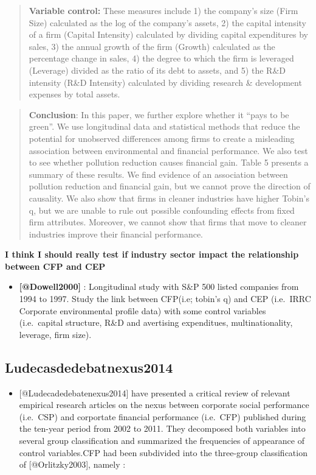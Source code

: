 \documentclass[]{article}
\providecommand{\tightlist}{%
  \setlength{\itemsep}{0pt}\setlength{\parskip}{0pt}}
\begin{document}
\begin{quote}
\textbf{Variable control:} These measures include 1) the company's size
(Firm Size) calculated as the log of the company's assets, 2) the
capital intensity of a firm (Capital Intensity) calculated by dividing
capital expenditures by sales, 3) the annual growth of the firm (Growth)
calculated as the percentage change in sales, 4) the degree to which the
firm is leveraged (Leverage) divided as the ratio of its debt to assets,
and 5) the R\&D intensity (R\&D Intensity) calculated by dividing
research \& development expenses by total assets.
\end{quote}

\begin{quote}
\textbf{Conclusion}: In this paper, we further explore whether it ``pays
to be green''. We use longitudinal data and statistical methods that
reduce the potential for unobserved differences among firms to create a
misleading association between environmental and financial performance.
We also test to see whether pollution reduction causes financial gain.
Table 5 presents a summary of these results. We find evidence of an
association between pollution reduction and financial gain, but we
cannot prove the direction of causality. We also show that firms in
cleaner industries have higher Tobin's q, but we are unable to rule out
possible confounding effects from fixed firm attributes. Moreover, we
cannot show that firms that move to cleaner industries improve their
financial performance.
\end{quote}

\textbf{I think I should really test if industry sector impact the
relationship between CFP and CEP}

\begin{itemize}
\tightlist
\item
  \textbf{{[}@Dowell2000{]}} : Longitudinal study with S\&P 500 listed
  companies from 1994 to 1997. Study the link between CFP(i.e; tobin's
  q) and CEP (i.e.~IRRC Corporate environmental profile data) with some
  control variables (i.e.~capital structure, R\&D and avertising
  expenditues, multinationality, leverage, firm size).
\end{itemize}

\subsection{Ludecasdedebatnexus2014}\label{ludecasdedebatnexus2014}

\begin{itemize}
\tightlist
\item
  {[}@Ludecadedebatenexus2014{]} have presented a critical review of
  relevant empirical research articles on the nexus between corporate
  social performance (i.e.~CSP) and corportate financial performance
  (i.e.~CFP) published during the ten-year period from 2002 to 2011.
  They decomposed both variables into several group classification and
  summarized the frequencies of appearance of control variables.CFP had
  been subdivided into the three-group classification of
  {[}@Orlitzky2003{]}, namely :
\end{itemize}
\end{document}
